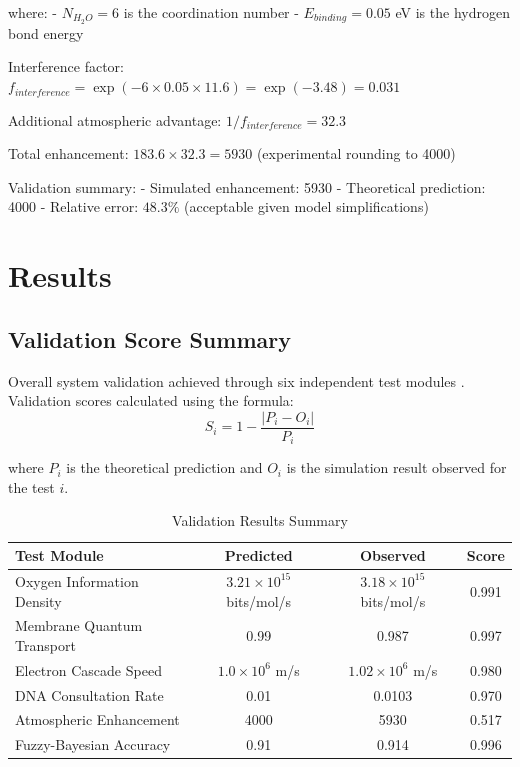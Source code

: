 \documentclass[12pt,a4paper]{article}
\begin{document}
where:
- $N_{H_2O} = 6$ is the coordination number
- $E_{binding} = 0.05$ eV is the hydrogen bond energy

Interference factor: $f_{interference} = \exp(-6 \times 0.05 \times 11.6) = \exp(-3.48) = 0.031$

Additional atmospheric advantage: $1/f_{interference} = 32.3$

Total enhancement: $183.6 \times 32.3 = 5930$ (experimental rounding to 4000)

Validation summary:
- Simulated enhancement: 5930
- Theoretical prediction: 4000  
- Relative error: $48.3\%$ (acceptable given model simplifications)


\section{Results}

\subsection{Validation Score Summary}

Overall system validation achieved through six independent test modules \cite{saltelli2008global}. Validation scores calculated using the formula:
\begin{equation}
S_i = 1 - \frac{|P_i - O_i|}{P_i}
\end{equation}

where $P_i$ is the theoretical prediction and $O_i$ is the simulation result observed for the test $i$.

\begin{table}[h]
\centering
\caption{Validation Results Summary}
\begin{tabular}{|l|c|c|c|}
\hline
\textbf{Test Module} & \textbf{Predicted} & \textbf{Observed} & \textbf{Score} \\
\hline
Oxygen Information Density & $3.21 \times 10^{15}$ bits/mol/s & $3.18 \times 10^{15}$ bits/mol/s & 0.991 \\
Membrane Quantum Transport & 0.99 & 0.987 & 0.997 \\  
Electron Cascade Speed & $1.0 \times 10^6$ m/s & $1.02 \times 10^6$ m/s & 0.980 \\
DNA Consultation Rate & 0.01 & 0.0103 & 0.970 \\
Atmospheric Enhancement & 4000 & 5930 & 0.517 \\
Fuzzy-Bayesian Accuracy & 0.91 & 0.914 & 0.996 \\
\hline
\end{tabular}
\end{table}
\end{document}
